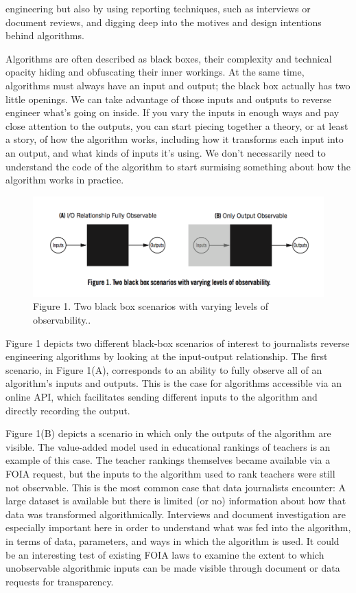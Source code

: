 engineering but also by using reporting techniques, such as interviews or document reviews, and digging deep into the motives and design intentions behind algorithms. 

Algorithms are often described as black boxes, their complexity and technical opacity hiding and obfuscating their inner workings. At the same time, algorithms must always have an input and output; the black box actually has two little openings. We can take advantage of those inputs and outputs to reverse engineer what's going on inside. If you vary the inputs in enough ways and pay close attention to the outputs, you can start piecing together a theory, or at least a story, of how the algorithm works, including how it transforms each input into an output, and what kinds of inputs it's using. We don't necessarily need to understand the code of the algorithm to start surmising something about how the algorithm works in practice. 

\begin{figure}
\includegraphics{images/BlackBoxObservability.png}
\caption{Figure 1. Two black box scenarios with varying levels of observability..}
\end{figure}

Figure 1 depicts two different black-box scenarios of interest to journalists reverse engineering algorithms by looking at the input-output relationship. The first scenario, in Figure 1(A), corresponds to an ability to fully observe all of an algorithm's inputs and outputs. This is the case for algorithms accessible via an online API, which facilitates sending different inputs to the algorithm and directly recording the output. 

Figure 1(B) depicts a scenario in which only the outputs of the algorithm are visible. The value-added model used in educational rankings of teachers is an example of this case. The teacher rankings themselves became available via a FOIA request, but the inputs to the algorithm used to rank teachers were still not observable. This is the most common case that data journalists encounter: A large dataset is available but there is limited (or no) information about how that data was transformed algorithmically. Interviews and document investigation are especially important here in order to understand what was fed into the algorithm, in terms of data, parameters, and ways in which the algorithm is used. It could be an interesting test of existing FOIA laws to examine the extent to which unobservable algorithmic inputs can be made visible through document or data requests for transparency. 

